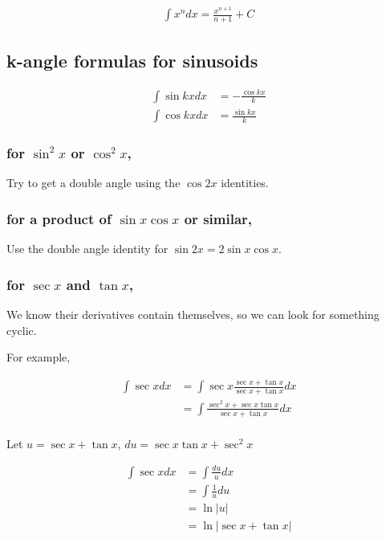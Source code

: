 \documentclass[letterpaper]{article}
\begin{document}
\[\begin{aligned}
   \int x^n dx = \frac{x^{n+1}}{n+1} +C
   \end{aligned}\]

\subsection{k-angle formulas for sinusoids}
\label{sec:org6914bda}

\[\begin{aligned}
   \int \sin kx dx &= - \frac{\cos kx}{k}\\
   \int \cos kx dx &= \frac{\sin kx}{k}
   \end{aligned}\]

\subsubsection{for \(\sin ^2x\) or \(\cos ^2x\),}
\label{sec:org6022644}
Try to get a double angle using the \(\cos 2x\) identities.

\subsubsection{for a product of \(\sin x \cos  x\) or similar,}
\label{sec:org9b6c674}
Use the double angle identity for \(\sin 2x = 2 \sin x \cos  x\).

\subsubsection{for \(\sec x\) and \(\tan x\),}
\label{sec:orgd616841}
We know their derivatives contain themselves, so we can look for something cyclic.

For example,

\[\begin{aligned}
    \int \sec x dx &= \int \sec x \frac{\sec  x + \tan  x}{\sec x+\tan x} dx \\
	&= \int \frac{\sec ^2x + \sec x \tan x}{\sec x+\tan x} dx \\
	\end{aligned}\]

Let \(u = \sec x+\tan x\), \(du = \sec x\tan x + \sec ^2x\)

\[\begin{aligned}
    \int \sec x dx &= \int \frac{du}{u} dx \\
	&= \int \frac{1}{u} du\\
	&= \ln | u | \\
	&= \ln | \sec x+\tan x|
	\end{aligned}\]
\end{document}
